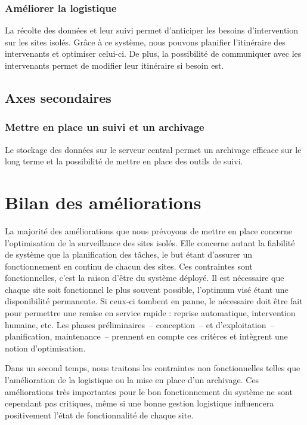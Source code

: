 \documentclass[a4paper, 11pt]{article}
\begin{document}
\subsubsection{Améliorer la logistique}
La récolte des données et leur suivi permet d'anticiper les besoins d'intervention sur les sites isolés. Grâce à ce système, nous pouvons planifier l'itinéraire des intervenants et optimiser celui-ci. De plus, la possibilité de communiquer avec les intervenants permet de modifier leur itinéraire si besoin est.
\subsection{Axes secondaires}
\subsubsection{Mettre en place un suivi et un archivage}
Le stockage des données sur le serveur central permet un archivage efficace sur le long terme et la possibilité de mettre en place des outils de suivi.

\section{Bilan des améliorations}
La majorité des améliorations que nous prévoyons de mettre en place concerne l'optimisation de la surveillance des sites isolés. Elle concerne autant la fiabilité de système que la planification des tâches, le but étant d'assurer un fonctionnement en continu de chacun des sites. Ces contraintes sont fonctionnelles, c'est la raison d'être du système déployé. Il est nécessaire que chaque site soit fonctionnel le plus souvent possible, l'optimum visé étant une disponibilité permanente. Si ceux-ci tombent en panne, le nécessaire doit être fait pour permettre une remise en service rapide : reprise automatique, intervention humaine, etc. Les phases préliminaires~-- conception~-- et d'exploitation~-- planification, maintenance~-- prennent en compte ces critères et intègrent une notion d'optimisation.  

Dans un second temps, nous traitons les contraintes non fonctionnelles telles que l'amélioration de la logistique ou la mise en place d'un archivage. Ces améliorations très importantes pour le bon fonctionnement du système ne sont cependant pas critiques, même si une bonne gestion logistique influencera positivement l'état de fonctionnalité de chaque site.

\end{document}
